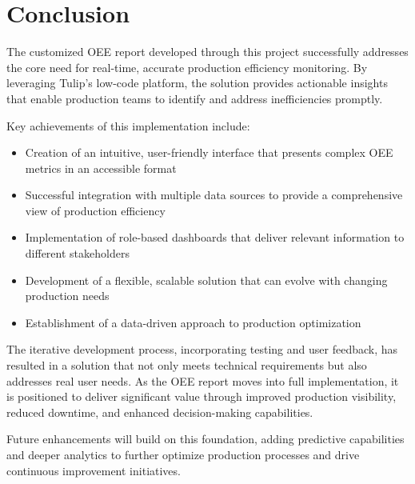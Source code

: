 \documentclass[11pt,a4paper]{article}
\begin{document}
\section{Conclusion}

The customized OEE report developed through this project successfully addresses the core need for real-time, accurate production efficiency monitoring. By leveraging Tulip's low-code platform, the solution provides actionable insights that enable production teams to identify and address inefficiencies promptly.

Key achievements of this implementation include:

\begin{itemize}
    \item Creation of an intuitive, user-friendly interface that presents complex OEE metrics in an accessible format
    \item Successful integration with multiple data sources to provide a comprehensive view of production efficiency
    \item Implementation of role-based dashboards that deliver relevant information to different stakeholders
    \item Development of a flexible, scalable solution that can evolve with changing production needs
    \item Establishment of a data-driven approach to production optimization
\end{itemize}

The iterative development process, incorporating testing and user feedback, has resulted in a solution that not only meets technical requirements but also addresses real user needs. As the OEE report moves into full implementation, it is positioned to deliver significant value through improved production visibility, reduced downtime, and enhanced decision-making capabilities.

Future enhancements will build on this foundation, adding predictive capabilities and deeper analytics to further optimize production processes and drive continuous improvement initiatives.
\end{document}

